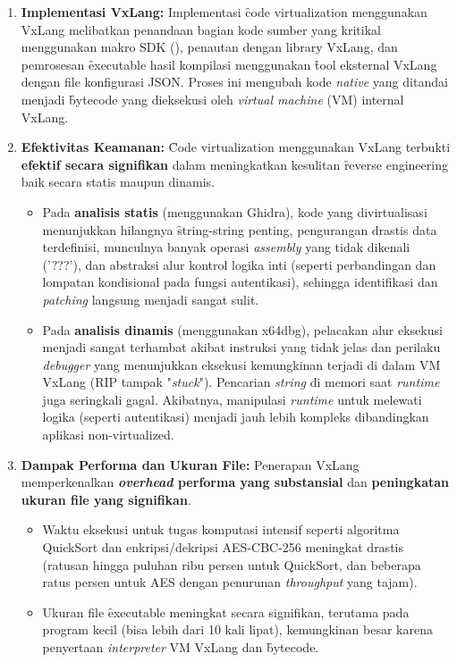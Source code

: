 \begin{enumerate}
    \item \textbf{Implementasi VxLang:} Implementasi \f{code virtualization} menggunakan VxLang melibatkan penandaan bagian kode sumber yang kritikal menggunakan makro SDK (), penautan dengan library VxLang, dan pemrosesan \f{executable} hasil kompilasi menggunakan \f{tool} eksternal VxLang dengan file konfigurasi JSON. Proses ini mengubah kode \textit{native} yang ditandai menjadi \f{bytecode} yang dieksekusi oleh \textit{virtual machine} (VM) internal VxLang.

    \item \textbf{Efektivitas Keamanan:} \f{Code virtualization} menggunakan VxLang terbukti \textbf{efektif secara signifikan} dalam meningkatkan kesulitan \f{reverse engineering} baik secara statis maupun dinamis.
        \begin{itemize}
            \item Pada \textbf{analisis statis} (menggunakan Ghidra), kode yang divirtualisasi menunjukkan hilangnya \f{string-string} penting, pengurangan drastis data terdefinisi, munculnya banyak operasi \textit{assembly} yang tidak dikenali ('???'), dan abstraksi alur kontrol logika inti (seperti perbandingan dan lompatan kondisional pada fungsi autentikasi), sehingga identifikasi dan \textit{patching} langsung menjadi sangat sulit.
            \item Pada \textbf{analisis dinamis} (menggunakan x64dbg), pelacakan alur eksekusi menjadi sangat terhambat akibat instruksi yang tidak jelas dan perilaku \textit{debugger} yang menunjukkan eksekusi kemungkinan terjadi di dalam VM VxLang (RIP tampak "\textit{stuck}"). Pencarian \textit{string} di memori saat \textit{runtime} juga seringkali gagal. Akibatnya, manipulasi \textit{runtime} untuk melewati logika (seperti autentikasi) menjadi jauh lebih kompleks dibandingkan aplikasi non-virtualized.
        \end{itemize}

    \item \textbf{Dampak Performa dan Ukuran File:} Penerapan VxLang memperkenalkan \textbf{\textit{overhead} performa yang substansial} dan \textbf{peningkatan ukuran file yang signifikan}.
        \begin{itemize}
            \item Waktu eksekusi untuk tugas komputasi intensif seperti algoritma QuickSort dan enkripsi/dekripsi AES-CBC-256 meningkat drastis (ratusan hingga puluhan ribu persen untuk QuickSort, dan beberapa ratus persen untuk AES dengan penurunan \textit{throughput} yang tajam).
            \item Ukuran file \f{executable} meningkat secara signifikan, terutama pada program kecil (bisa lebih dari 10 kali lipat), kemungkinan besar karena penyertaan \textit{interpreter} VM VxLang dan \f{bytecode}.
        \end{itemize}


\end{enumerate}
